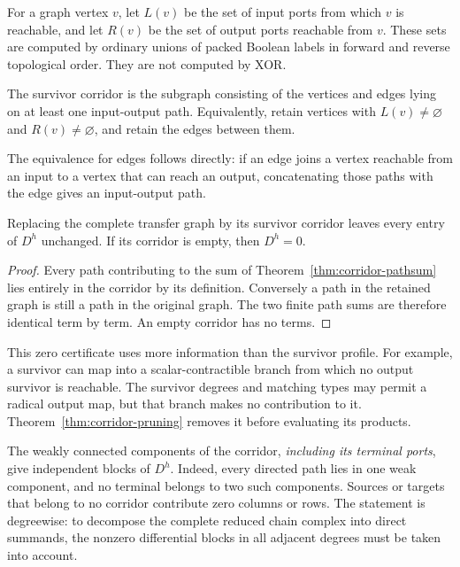 For a graph vertex $v$, let $L(v)$ be the set of input ports from which $v$
is reachable, and let $R(v)$ be the set of output ports reachable from $v$.
These sets are computed by ordinary unions of packed Boolean labels in
forward and reverse topological order.  They are not computed by XOR.

\begin{definition}\label{def:corridor}
The survivor corridor is the subgraph consisting of the vertices and edges
lying on at least one input-output path.  Equivalently, retain vertices with
$L(v)\ne\varnothing$ and $R(v)\ne\varnothing$, and retain the edges between
them.
\end{definition}

The equivalence for edges follows directly: if an edge joins a vertex
reachable from an input to a vertex that can reach an output, concatenating
those paths with the edge gives an input-output path.

\begin{theorem}\label{thm:corridor-pruning}
Replacing the complete transfer graph by its survivor corridor leaves every
entry of $D^h$ unchanged.  If its corridor is empty, then $D^h=0$.
\end{theorem}
\begin{proof}
Every path contributing to the sum of Theorem~\ref{thm:corridor-pathsum}
lies entirely in the corridor by its definition.  Conversely a path in the
retained graph is still a path in the original graph.  The two finite path
sums are therefore identical term by term.  An empty corridor has no terms.
\end{proof}

This zero certificate uses more information than the survivor profile.  For
example, a survivor can map into a scalar-contractible branch from which no
output survivor is reachable.  The survivor degrees and matching types may
permit a radical output map, but that branch makes no contribution to it.
Theorem~\ref{thm:corridor-pruning} removes it before evaluating its products.

The weakly connected components of the corridor, \emph{including its terminal
ports}, give independent blocks of $D^h$.  Indeed, every directed path lies
in one weak component, and no terminal belongs to two such components.
Sources or targets that belong to no corridor contribute zero columns or
rows.  The statement is degreewise: to decompose the complete reduced chain
complex into direct summands, the nonzero differential blocks in all adjacent
degrees must be taken into account.

